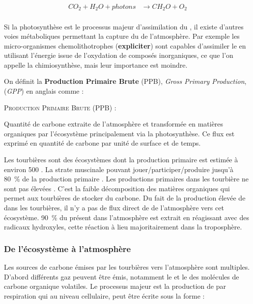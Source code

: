 $$\begin{aligned}
CO_{2} + H_{2}O + photons &\rightarrow CH_{2}O + O_{2}\\
\end{aligned} $$

Si la photosynthèse est le processus majeur d'assimilation du \coo, il existe d'autres voies métaboliques permettant la capture du \coo de l'atmosphère.
Par exemple les micro-organismes chemolithotrophes (\textbf{expliciter}) sont capables d'assimiler le \coo en utilisant l'énergie issue de l'oxydation de composés inorganiques, ce que l'on appelle la chimiosynthèse, mais leur importance est moindre.

On définit la \textbf{Production Primaire Brute} (PPB), \textit{Gross Primary Production}, (\textit{GPP}) en anglais
comme :

\begin{pdef}
\textsc{Production Primaire Brute (PPB)} :

Quantité de carbone extraite de l'atmosphère et transformée en matières organiques par l'écosystème principalement via la photosynthèse.
Ce flux est exprimé en quantité de carbone par unité de surface et de temps.
\end{pdef}

Les tourbières sont des écosystèmes dont la production primaire est estimée à environ \SI{500}{\gcm} \citep{francez2000}.
La strate muscinale pouvant jouer/participer/produire jusqu'à \SI{80}{\percent} de la production primaire \citep{francez2000}.
Les productions primaires dans les tourbière ne sont pas élevées \plop.
C'est la faible décomposition des matières organiques qui permet aux tourbières de stocker du carbone.
Du fait de la production élevée de \chh dans les tourbières, il n'y a pas de flux direct de \chh de l'atmosphère vers cet écosystème.
\SI{90}{\percent} du \chh présent dans l'atmosphère est extrait en réagissant avec des radicaux hydroxyles, cette réaction à lieu majoritairement dans la troposphère.

\subsubsection{De l'écosystème à l'atmosphère}

Les sources de carbone émises par les tourbières vers l'atmosphère sont multiples.
D'abord différents gaz peuvent être émis, notamment le \coo et le \chh des molécules de carbone organique volatiles.
Le processus majeur est la production de \coo par respiration qui au niveau cellulaire, peut être écrite sous la forme :

